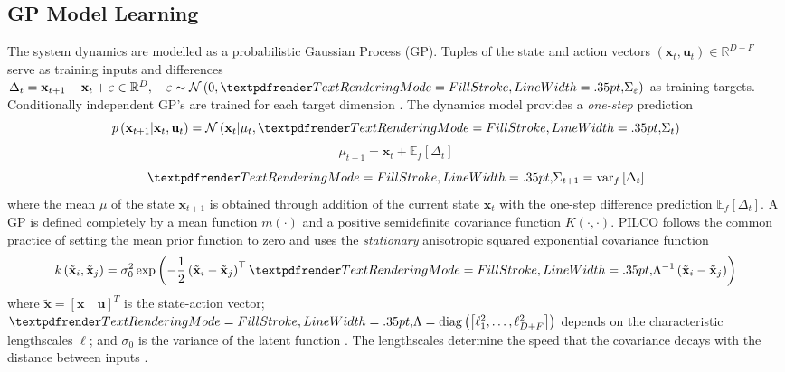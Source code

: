 \subsection{GP Model Learning}
\label{PILCO:GP-model-learning}
The system dynamics are modelled as a probabilistic Gaussian Process (GP). Tuples of the state and action vectors $\left(\mathbf{x}_{t}, \mathbf{u}_{t}\right)\in \mathbb{R}^{D+F}$ serve as training inputs and differences $\Delta_{t}=\mathbf{x}_{t+1}-\mathbf{x}_{t}+\varepsilon \in \mathbb{R}^{D},\quad \varepsilon \sim \mathcal{N}\left(0, \boldgreek{\Sigma}_{\varepsilon}\right)$ as training targets. Conditionally independent GP's are trained for each target dimension \citep{deisenroth2010efficient}. The dynamics model provides a \textit{one-step} prediction \citep{deisenroth2011pilco}
\begin{equation}
    p\left(\mathbf{x}_{t+1} | \mathbf{x}_{t}, \mathbf{u}_{t}\right)=\mathcal{N}\left(\mathbf{x}_{t} | \mu_{t}, \boldgreek{\Sigma}_{t}\right)
    \label{Eq:PILCO-one-step-1}
\end{equation}
\begin{equation}
    \mu_{t+1}=\mathbf{x}_{t}+\mathbb{E}_{f}\left[\Delta_{t}\right]
    \label{Eq:PILCO-one-step-2}
\end{equation}
\begin{equation}
    \boldgreek{\Sigma}_{t+1}=\operatorname{var}_{f}\left[\Delta_{t}\right]
    \label{Eq:PILCO-one-step-3}
\end{equation}
where the mean $\mu$ of the state $\mathbf{x}_{t+1}$ is obtained through addition of the current state $\mathbf{x}_{t}$ with the one-step difference prediction $\mathbb{E}_{f}\left[\Delta_{t}\right]$. A GP is defined completely by a mean function $m(\cdot)$ and a positive semidefinite covariance function $K(\cdot,\cdot)$. PILCO follows the common practice of setting the mean prior function to zero and uses the \textit{stationary} anisotropic squared exponential covariance function
\begin{equation}
    k\left(\tilde{\mathbf{x}}_{i}, \tilde{\mathbf{x}}_{j}\right)=\sigma_{0}^{2} \exp \left(-\frac{1}{2}\left(\tilde{\mathbf{x}}_{i}-\tilde{\mathbf{x}}_{j}\right)^{\top} \boldgreek{\Lambda}^{-1}\left(\tilde{\mathbf{x}}_{i}-\tilde{\mathbf{x}}_{j}\right)\right)
    \label{Eq:PILCO-sq-exponential-covariance}
\end{equation}
where $\tilde{\mathbf{x}} = \left[\mathbf{x}\quad\mathbf{u}\right]^{T}$ is the state-action vector; $\boldgreek{\Lambda} =\operatorname{diag}\left(\left[\ell_{1}^{2}, \ldots, \ell_{D+F}^{2}\right]\right)$ depends on the characteristic lengthscales $\ell$; and $\sigma_{0}$ is the variance of the latent function \citep{deisenroth2013gaussian}. The lengthscales determine the speed that the covariance decays with the distance between inputs \citep{quia2010sparse}.

